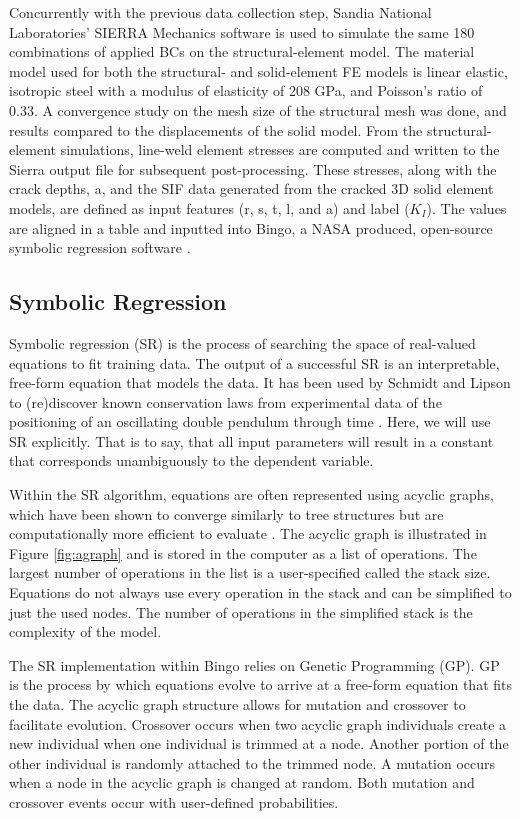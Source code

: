 Concurrently with the previous data collection step, Sandia National
Laboratories’ SIERRA Mechanics software \cite{osti_1433781} is used to simulate
the same 180 combinations of applied BCs on the structural-element model. The
material model used for both the structural- and solid-element FE models is
linear elastic, isotropic steel with a modulus of elasticity of 208 GPa, and
Poisson's ratio of 0.33. A convergence study on the
mesh size of the structural mesh was done, and results compared to the
displacements of the solid model.  From the structural-element simulations,
line-weld element stresses are computed and written to the Sierra output file
for subsequent post-processing.  These stresses, along with the crack depths, a, and the
SIF data generated from the cracked 3D solid element models, are defined as
input features (r, s, t, l, and a) and label ($K_I$). The
values are aligned in a table and inputted into Bingo, a NASA produced,
open-source symbolic regression software \cite{bingosymbolicregression}. 

\subsection{Symbolic Regression} \label{symbolic_regression}

Symbolic regression (SR) is the process of searching the space of real-valued
equations to fit training data. The output of a successful SR is an
interpretable, free-form equation that models the data. It has been used by
Schmidt and Lipson to (re)discover known conservation laws from experimental data of
the positioning of an oscillating double pendulum through time
\cite{schmidt2009distilling}.  Here, we will use SR explicitly. That is to say,
that all input parameters will result in a constant that corresponds
unambiguously to the dependent variable.

Within the SR algorithm, equations are often represented using acyclic graphs,
which have been shown to converge similarly to tree structures but are
computationally more efficient to evaluate \cite{schmidt2007comparison}. The
acyclic graph is illustrated in Figure \ref{fig:agraph} and is stored in the
computer as a list of operations. The largest number of operations in the list
is a user-specified called the stack size. Equations do not always use every
operation in the stack and can be simplified to just the used nodes.
The number of operations in the simplified stack is the complexity of the model.

The SR implementation within Bingo relies on Genetic Programming (GP). GP is the
process by which equations evolve to arrive at a free-form equation that fits
the data. The acyclic graph structure allows for mutation and crossover to
facilitate evolution. Crossover occurs when two acyclic graph individuals create
a new individual when one individual is trimmed at a node. Another portion of
the other individual is randomly attached to the trimmed node. A mutation occurs
when a node in the acyclic graph is changed at random. Both mutation and
crossover events occur with user-defined probabilities.


